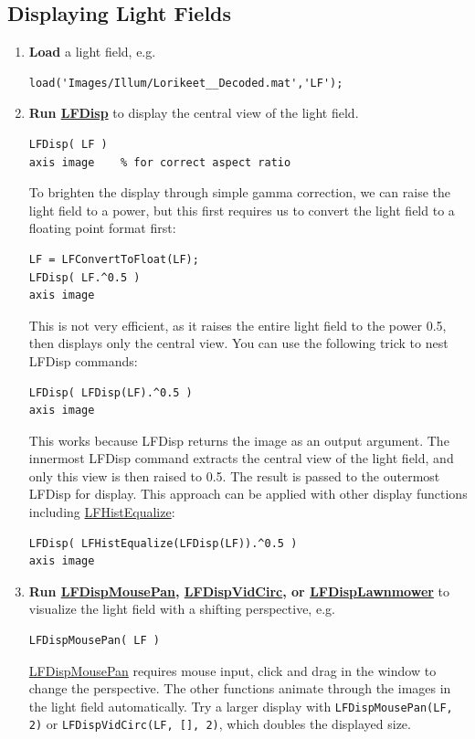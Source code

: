 \documentclass[onecolumn]{article}
\newcommand{\CiteFunc}[1]{\hyperlink{#1}{\small #1}}
\newcommand{\SymbolText}[1]{\texttt{\small #1}}
\begin{document}
\subsection{Displaying Light Fields}
\label{sect_DisplayingTour}
\begin{enumerate}[leftmargin=1.5em,rightmargin=0.5cm]
\item \textbf{Load} a light field, e.g.
\begin{Verbatim}
load('Images/Illum/Lorikeet__Decoded.mat','LF');
\end{Verbatim}
\item \textbf{Run \CiteFunc{LFDisp}} to display the central view of the light field.
\begin{Verbatim}
LFDisp( LF )
axis image    % for correct aspect ratio
\end{Verbatim}
To brighten the display through simple gamma correction, we can raise the light field to a power, but this first requires us to convert the light field to a floating point format first:
\begin{Verbatim}
LF = LFConvertToFloat(LF);
LFDisp( LF.^0.5 )
axis image
\end{Verbatim}
This is not very efficient, as it raises the entire light field to the power 0.5, then displays only the central view. You can use the following trick to nest LFDisp commands:
\begin{Verbatim}
LFDisp( LFDisp(LF).^0.5 )
axis image
\end{Verbatim}
This works because LFDisp returns the image as an output argument. The innermost LFDisp command extracts the central view of the light field, and only this view is then raised to 0.5. The result is passed to the outermost LFDisp for display. This approach can be applied with other display functions including \CiteFunc{LFHistEqualize}:
\begin{Verbatim}
LFDisp( LFHistEqualize(LFDisp(LF)).^0.5 )
axis image
\end{Verbatim}
\item \textbf{Run \CiteFunc{LFDispMousePan}, \CiteFunc{LFDispVidCirc}, or \CiteFunc{LFDispLawnmower}} to visualize the light field with a shifting perspective, e.g. 
\begin{Verbatim}
LFDispMousePan( LF )
\end{Verbatim}
\CiteFunc{LFDispMousePan} requires mouse input, click and drag in the window to change the perspective. The other functions animate through the images in the light field automatically.  Try a larger display with \SymbolText{LFDispMousePan(LF, 2)} or \SymbolText{LFDispVidCirc(LF, [], 2)}, which doubles the displayed size.


\end{enumerate}
\end{document}
